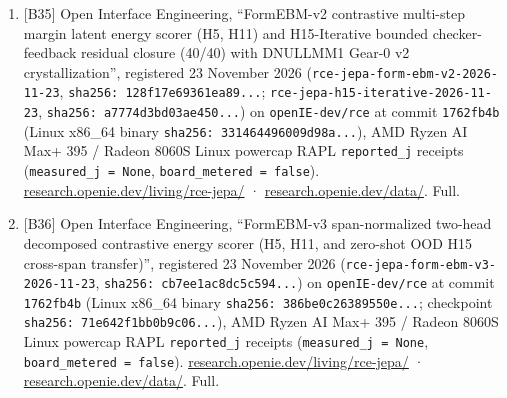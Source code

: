 \documentclass[10pt,letterpaper]{article}
\begin{document}
\begin{enumerate}
  \href{https://research.openie.dev/data/\#rce-jepa}{research.openie.dev/data/}.
  Full.
\item
  {[}B35{]} Open Interface Engineering, ``FormEBM-v2 contrastive
  multi-step margin latent energy scorer (H5, H11) and H15-Iterative
  bounded checker-feedback residual closure (40/40) with DNULLMM1 Gear-0
  v2 crystallization'', registered 23 November 2026
  (\texttt{rce-\allowbreak{}jepa-\allowbreak{}form-\allowbreak{}ebm-\allowbreak{}v2-\allowbreak{}2026-\allowbreak{}11-\allowbreak{}23},
  \texttt{sha256:\ 128f17e6\allowbreak{}9361ea89.\allowbreak{}.\allowbreak{}.\allowbreak{}};
  \texttt{rce-\allowbreak{}jepa-\allowbreak{}h15-\allowbreak{}iterative-\allowbreak{}2026-\allowbreak{}11-\allowbreak{}23},
  \texttt{sha256:\ a7774d3b\allowbreak{}d03ae450.\allowbreak{}.\allowbreak{}.\allowbreak{}}) on \texttt{openIE-\allowbreak{}dev/\allowbreak{}rce} at
  commit \texttt{1762fb4b} (Linux x86\_64 binary
  \texttt{sha256:\ 33146449\allowbreak{}6009d98a.\allowbreak{}.\allowbreak{}.\allowbreak{}}), AMD Ryzen AI Max+ 395 / Radeon
  8060S Linux powercap RAPL \texttt{reported\_\allowbreak{}j} receipts
  (\texttt{measured\_\allowbreak{}j\ =\ None}, \texttt{board\_\allowbreak{}metered\ =\ false}).
  \href{https://research.openie.dev/living/rce-jepa/}{research.openie.dev/living/rce-jepa/}
  ·
  \href{https://research.openie.dev/data/\#rce-jepa}{research.openie.dev/data/}.
  Full.
\item
  {[}B36{]} Open Interface Engineering, ``FormEBM-v3 span-normalized
  two-head decomposed contrastive energy scorer (H5, H11, and zero-shot
  OOD H15 cross-span transfer)'', registered 23 November 2026
  (\texttt{rce-\allowbreak{}jepa-\allowbreak{}form-\allowbreak{}ebm-\allowbreak{}v3-\allowbreak{}2026-\allowbreak{}11-\allowbreak{}23},
  \texttt{sha256:\ cb7ee1ac\allowbreak{}8dc5c594.\allowbreak{}.\allowbreak{}.\allowbreak{}}) on \texttt{openIE-\allowbreak{}dev/\allowbreak{}rce} at
  commit \texttt{1762fb4b} (Linux x86\_64 binary
  \texttt{sha256:\ 386be0c2\allowbreak{}6389550e.\allowbreak{}.\allowbreak{}.\allowbreak{}}; checkpoint
  \texttt{sha256:\ 71e642f1\allowbreak{}bb0b9c06.\allowbreak{}.\allowbreak{}.\allowbreak{}}), AMD Ryzen AI Max+ 395 / Radeon
  8060S Linux powercap RAPL \texttt{reported\_\allowbreak{}j} receipts
  (\texttt{measured\_\allowbreak{}j\ =\ None}, \texttt{board\_\allowbreak{}metered\ =\ false}).
  \href{https://research.openie.dev/living/rce-jepa/}{research.openie.dev/living/rce-jepa/}
  ·
  \href{https://research.openie.dev/data/\#rce-jepa}{research.openie.dev/data/}.
  Full.
\end{enumerate}
\end{document}
